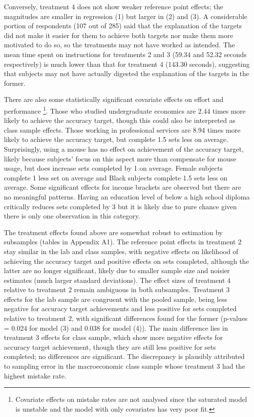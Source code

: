 \documentclass[12pt, letterpaper, DIV=11, numbers=noendperiod]{article}
\begin{document}
Conversely, treatment 4 does not show weaker reference point effects; the magnitudes are smaller in regression (1) but larger in (2) and (3). A considerable portion of respondents (107 out of 285) said that the explanation of the targets did not make it easier for them to achieve both targets nor make them more motivated to do so, so the treatments may not have worked as intended. The mean time spent on instructions for treatments 2 and 3 (59.34 and 52.32 seconds respectively) is much lower than that for treatment 4 (143.30 seconds), suggesting that subjects may not have actually digested the explanation of the targets in the former.

There are also some statistically significant covariate effects on effort and performance \footnote{Covariate effects on mistake rates are not analysed since the saturated model is unstable and the model with only covariates has very poor fit.}. Those who studied undergraduate economics are 2.44 times more likely to achieve the accuracy target, though this could also be interpreted as class sample effects. Those working in professional services are 8.94 times more likely to achieve the accuracy target, but complete 1.5 sets less on average. Surprisingly, using a mouse has no effect on achievement of the accuracy target, likely because subjects' focus on this aspect more than compensate for mouse usage, but does increase sets completed by 1 on average. Female subjects complete 1 less set on average and Black subjects complete 1.5 sets less on average. Some significant effects for income brackets are observed but there are no meaningful patterns. Having an education level of below a high school diploma critically reduces sets completed by 3 but it is likely due to pure chance given there is only one observation in this category.

The treatment effects found above are somewhat robust to estimation by subsamples (tables in Appendix A1). The reference point effects in treatment 2 stay similar in the lab and class samples, with negative effects on likelihood of achieving the accuracy target and positive effects on sets completed, although the latter are no longer significant, likely due to smaller sample size and noisier estimates (much larger standard deviations). The effect sizes of treatment 4 relative to treatment 2 remain ambiguous in both subsamples. Treatment 3 effects for the lab sample are congruent with the pooled sample, being less negative for accuracy target achievements and less positive for sets completed relative to treatment 2, with significant differences found for the former (p-values = 0.024 for model (3) and 0.038 for model (4)). The main difference lies in treatment 3 effects for class sample, which show more negative effects for accuracy target achievement, though they are still less positive for sets completed; no differences are significant. The discrepancy is plausibly attributed to sampling error in the macroeconomic class sample whose treatment 3 had the highest mistake rate.
\end{document}
